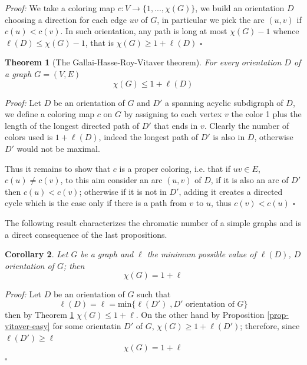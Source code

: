 \documentclass[a4paper,12pt,oneside]{book}
\newtheorem{theorem}{Theorem}[chapter]
\newtheorem{corollary}[theorem]{Corollary}
\newcommand*{\QED}{\hfill\ensuremath{\square}}
\begin{document}
\textit{Proof:}  We take a coloring map $c:V\rightarrow \{1,...,\chi (G)\}$, we build an orientation
 $D$ choosing a direction for each edge $uv$ of $G$, in particular we pick the arc 
 $(u,v)$ if $c(u)< c(v)$. In such orientation, any path is long at most $\chi 
 (G)-1$ whence $\ell(D)\leq \chi (G)-1  $, that is $ \chi (G) \geq 1+\ell(D) $ 
\QED

\begin{theorem}[The Gallai-Hasse-Roy-Vitaver theorem]\label{vitaver}
For every orientation $D$ of a graph $G=(V,E)$ $$\chi (G)\leq 1 + \ell(D)$$
\end{theorem}
\textit{Proof: }Let $D$ be an orientation of $G$ and $D'$ a spanning acyclic subdigraph of $D$, we define a coloring map $c$ on $G$ by assigning to each vertex $v$ the color 1 plus the length of the longest directed path of $D'$ that ends in $v$. Clearly the number of colors used is $1+\ell(D)$, indeed the longest path of $D'$ is also in $D$, otherwise $D'$ would not be maximal. 

Thus it remains to show that $c$ is a proper coloring, i.e. that if $uv\in E$, $c(u)\neq c(v) $, to this aim consider an arc $(u,v)$ of $D$, if it is also an arc of $D'$ then $c(u)<c(v)$; otherwise if it is not in $D'$, adding it creates a directed cycle which is the case only if there is a path from $v$ to $u$, thus $c(v)<c(u)$ \QED

\noindent The following result characterizes the chromatic number of a simple graphs and is a direct consequence of the last propositions.
\begin{corollary}\label{cor-vitaver}
Let $G$ be a graph and $\ell$ the minimum possible value of $\ell(D)$, $D$ orientation of $G$; then   
$$\chi (G)=1+\ell$$
\end{corollary}

\textit{Proof:}
Let $D$ be an orientation of $G$ such that 
$$\ell(D)=\ell=\textrm{min}\{\ell(D') \; 	,D' \textrm{ orientation of } G\}$$ 
then by Theorem \ref{vitaver} $\chi(G) \leq 1+\ell$. On the other hand by Proposition \ref{prop-vitaver-easy} for some orientatin $D'$  of $G$, $\chi(G)\geq 1+\ell(D')$; therefore, since $\ell(D')\geq\ell$ 
$$\chi (G)=1+\ell$$\QED
\end{document}
